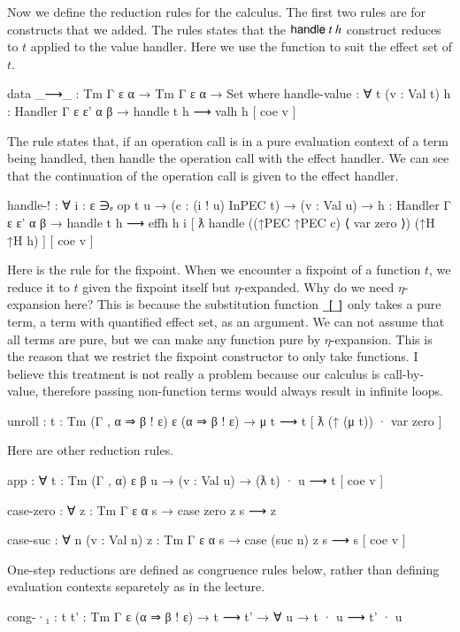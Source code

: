 \documentclass[a4paper,11pt]{article}
\newcommand\fun[1]{{\AgdaFunction{#1}}}
\newcommand\con[1]{{\AgdaInductiveConstructor{#1}}}
\begin{document}
Now we define the reduction rules for the calculus.
The first two rules are for constructs that we added.
The \con{handle-value} rules states that the $\con{handle}\ t\ h$ construct reduces to $t$ applied to the value handler.
Here we use the \fun{coe} function to suit the effect set of $t$.
\begin{AgdaAlign}
\begin{code}
  data _⟶_ : Tm Γ ε α → Tm Γ ε α → Set where
    handle-value : ∀ {t} (v : Val t) {h : Handler Γ ε ε' α β}
      → handle t h ⟶ valh h [ coe v ]
\end{code}
The \con{handle-!} rule states that, if an operation call is in a pure evaluation context of a term being handled, then handle the operation call with the effect handler.
We can see that the continuation of the operation call is given to the effect handler.
\begin{code}
    handle-! : ∀ {i : ε ∋ₑ op} {t u}
      → (c : (i ! u) InPEC t)
      → (v : Val u)
      → {h : Handler Γ ε ε' α β}
      → handle t h ⟶ effh h i [ ƛ handle ((↑PEC ↑PEC c) ⟨ var zero ⟩) (↑H ↑H h) ] [ coe v ]
\end{code}
Here is the rule for the fixpoint. When we encounter a fixpoint of a function $t$, we reduce it to $t$ given
the fixpoint itself but $\eta$-expanded. Why do we need $\eta$-expansion here? This is because the substitution function $\fun{\_[\_]}$ only takes a pure term, a term with quantified effect set, as an argument.
We can not assume that all terms are pure, but we can make any function pure by $\eta$-expansion.
This is the reason that we restrict the fixpoint constructor to only take functions.
I believe this treatment is not really a problem because our calculus is call-by-value, therefore passing non-function terms would always result in infinite loops.
\begin{code}
    unroll : {t : Tm (Γ , α ⇒ β ! ε) ε (α ⇒ β ! ε)}
      → μ t ⟶ t [ ƛ (↑ (μ t)) · var zero ]
\end{code}
Here are other reduction rules.
\begin{code}
    app : ∀ {t : Tm (Γ , α) ε β} {u}
      → (v : Val u)
      → (ƛ t) · u ⟶ t [ coe v ]

    case-zero : ∀ {z : Tm Γ ε α} {s}
      → case zero z s ⟶ z

    case-suc : ∀ {n} (v : Val n) {z : Tm Γ ε α} {s}
      → case (suc n) z s ⟶ s [ coe v ]
\end{code}
One-step reductions are defined as congruence rules below, rather than defining evaluation contexts separetely as in the lecture.
\begin{code}
    cong-·₁ : {t t' : Tm Γ ε (α ⇒ β ! ε)}
      → t ⟶ t'
      → ∀ {u} → t · u ⟶ t' · u


\end{code}
\end{AgdaAlign}
\end{document}
